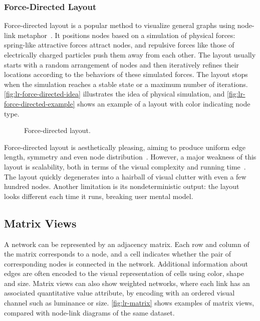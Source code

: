 \subsubsection{Force-Directed Layout}
Force-directed layout is a popular method to visualize general graphs using node-link metaphor~\cite{Eades1984}. It positions nodes based on a simulation of physical forces: spring-like attractive forces attract nodes, and repulsive forces like those of electrically charged particles push them away from each other. The layout usually starts with a random arrangement of nodes and then iteratively refines their locations according to the behaviors of these simulated forces. The layout stops when the simulation reaches a stable state or a maximum number of iterations. \autoref{fig:lr-force-directed-idea} illustrates the idea of physical simulation, and \autoref{fig:lr-force-directed-example} shows an example of a layout with color indicating node type.

\begin{figure}[!htb]
\centering
{}
\hfill
{}
\caption{Force-directed layout.}
\end{figure}

Force-directed layout is aesthetically pleasing, aiming to produce uniform edge length, symmetry and even node distribution~\cite{Fruchterman1991}. However, a major weakness of this layout is scalability, both in terms of the visual complexity and running time~\cite{Munzner2014}. The layout quickly degenerates into a hairball of visual clutter with even a few hundred nodes. Another limitation is its nondeterministic output: the layout looks different each time it runs, breaking user mental model.

\subsection{Matrix Views}
A network can be represented by an adjacency matrix. Each row and column of the matrix corresponds to a node, and a cell indicates whether the pair of corresponding nodes is connected in the network. Additional information about edges are often encoded to the visual representation of cells using color, shape and size. Matrix views can also show weighted networks, where each link has an associated quantitative value attribute, by encoding with an ordered visual channel such as luminance or size. \autoref{fig:lr-matrix} shows examples of matrix views, compared with node-link diagrams of the same dataset.

